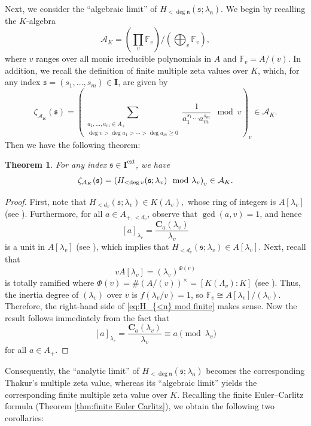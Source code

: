 \documentclass[12pt,reqno]{amsart}
\numberwithin{equation}{section}
\theoremstyle{plain}
\newtheorem{thm}{Theorem}[section]
\theoremstyle{definition}
\theoremstyle{remark}
\newcommand{\FF}{\mathbb{F}}
\newcommand{\nfk}{\mathfrak{n}}
\newcommand{\Acal}{\mathcal{A}}
\newcommand{\ww}[1]{\mathfrak{#1}}
\newcommand{\C}{\mathbf{C}}
\newcommand{\Ical}{\mathbf{I}}
\newcommand{\ext}{\mathrm{ext}}
\begin{document}
Next, we consider the ``algebraic limit'' of $H_{<\deg\nfk}(\ww{s};\lambda_\nfk)$. We begin by recalling the $K$-algebra
$$\Acal_K=\left(\prod_{v}\FF_v\right)\Bigg/\left(\bigoplus_v \FF_v\right),$$
where $v$ ranges over all monic irreducible polynomials in $A$ and $\FF_v=A/(v)$. In addition, we recall the definition of finite multiple zeta values over $K$, which, for any index $\ww{s}=(s_1,\ldots,s_m)\in\Ical$, are given by
$$\zeta_{\Acal_K}(\ww{s})=\left(\sum_{\substack{a_1,\ldots,a_m\in A_+\\\deg v>\deg a_1>\cdots>\deg a_m\geq 0}}\frac{1}{a_1^{s_1}\cdots a_m^{s_m}}\mod{v}\right)_v\in\Acal_K.$$
Then we have the following theorem:
\begin{thm}\label{thm:u to finite MZV}
    For any index $\ww{s}\in\Ical^{\ext}$, we have
    \begin{equation}\label{eq:H_{<n} mod finite}
        \zeta_{\mathcal{A}_K}(\ww{s})=\left(H_{<\deg v}(\ww{s};\lambda_v)\mod{\lambda_v}\right)_v\in\mathcal{A}_K.
    \end{equation}
\end{thm}
\begin{proof}
   First, note that 
    $H_{<d_v}(\ww{s};\lambda_v)\in K(\Lambda_v),$ whose ring of integers is $A[\lambda_v]$ (see \cite[Proposition 12.9]{Rosen2002}). Furthermore, for all $a\in A_{+,<d_v}$, observe that $\gcd(a,v)=1$, and hence
    $$[a]_{\lambda_v}=\frac{\C_a(\lambda_v)}{\lambda_v}$$
    is a unit in $A[\lambda_v]$ (see \cite[Proposition 12.6]{Rosen2002}), which implies that $H_{<d_v}(\ww{s};\lambda_v)\in A[\lambda_v]$. Next, recall that
    $$vA[\lambda_v]=(\lambda_v)^{\Phi(v)}$$
    is totally ramified where $\Phi(v)=\#(A/(v))^\times=[K(\Lambda_v):K]$ (see \cite[Proposition 12.7]{Rosen2002}). Thus, the inertia degree of $(\lambda_v)$ over $v$ is $f(\lambda_v/v)=1$, so $\FF_v\cong A[\lambda_v]/(\lambda_v)$. Therefore, the right-hand side of \eqref{eq:H_{<n} mod finite} makes sense. Now the result follows immediately from the fact that
    $$[a]_{\lambda_v}=\frac{\C_a(\lambda_v)}{\lambda_v}\equiv a\pmod {\lambda_v}$$
    for all $a\in A_+$.
\end{proof}

Consequently, the ``analytic limit'' of $H_{<\deg\nfk}(\ww{s};\lambda_\nfk)$ becomes the corresponding Thakur's multiple zeta value, whereas its ``algebraic limit'' yields the corresponding finite multiple zeta value over $K$. Recalling the finite Euler--Carlitz formula (Theorem \ref{thm:finite Euler Carlitz}), we obtain the following two corollaries: 
\end{document}

